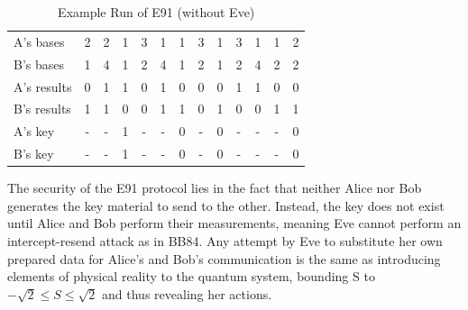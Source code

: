 \documentclass[conference]{IEEEtran}
\begin{document}
\begin{table}[h]
  \caption{Example Run of E91 (without Eve)}
  \begin{center}
    \begin{tabular}{|l|c c c c c c c c c c c c|}
      \hline
      A's bases   & 2 & 2 & 1 & 3 & 1 & 1 & 3 & 1 & 3 & 1 & 1 & 2\\
      B's bases   & 1 & 4 & 1 & 2 & 4 & 1 & 2 & 1 & 2 & 4 & 2 & 2\\
      A's results & 0 & 1 & 1 & 0 & 1 & 0 & 0 & 0 & 1 & 1 & 0 & 0\\
      B's results & 1 & 1 & 0 & 0 & 1 & 1 & 0 & 1 & 0 & 0 & 1 & 1\\
      \hline
      A's key     & - & - & 1 & - & - & 0 & - & 0 & - & - & - & 0\\
      B's key     & - & - & 1 & - & - & 0 & - & 0 & - & - & - & 0\\
      \hline
    \end{tabular}
  \end{center}
\end{table}
The security of the E91 protocol lies in the fact that neither Alice nor Bob generates the key material to send to the other. Instead, the key does not exist until Alice and Bob perform their measurements, meaning Eve cannot perform an intercept-resend attack as in BB84. Any attempt by Eve to substitute her own prepared data for Alice's and Bob's communication is the same as introducing elements of physical reality to the quantum system, bounding S to $-\sqrt{2}\leq S\leq\sqrt{2}$ and thus revealing her actions\cite{Bouwmeester}.\\
\end{document}
